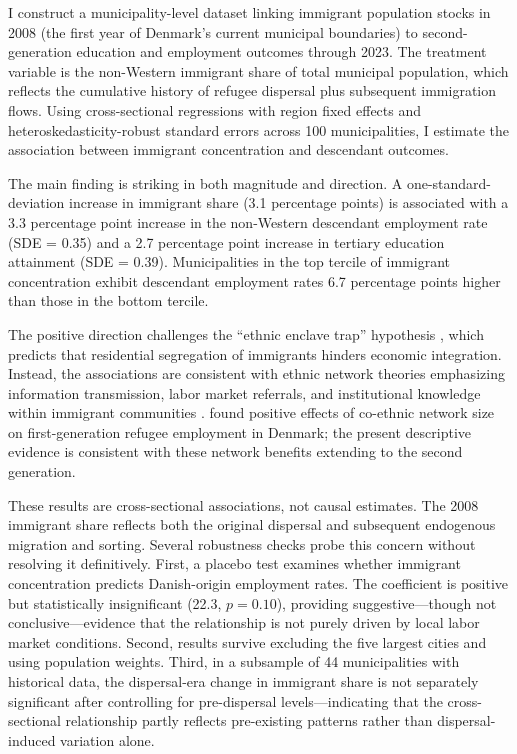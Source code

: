 \documentclass[12pt]{article}
\begin{document}
I construct a municipality-level dataset linking immigrant population stocks in 2008 (the first year of Denmark's current municipal boundaries) to second-generation education and employment outcomes through 2023. The treatment variable is the non-Western immigrant share of total municipal population, which reflects the cumulative history of refugee dispersal plus subsequent immigration flows. Using cross-sectional regressions with region fixed effects and heteroskedasticity-robust standard errors across 100 municipalities, I estimate the association between immigrant concentration and descendant outcomes.

The main finding is striking in both magnitude and direction. A one-standard-deviation increase in immigrant share (3.1 percentage points) is associated with a 3.3 percentage point increase in the non-Western descendant employment rate (SDE = 0.35) and a 2.7 percentage point increase in tertiary education attainment (SDE = 0.39). Municipalities in the top tercile of immigrant concentration exhibit descendant employment rates 6.7 percentage points higher than those in the bottom tercile.

The positive direction challenges the ``ethnic enclave trap'' hypothesis \citep{cutler1997, borjas1995}, which predicts that residential segregation of immigrants hinders economic integration. Instead, the associations are consistent with ethnic network theories emphasizing information transmission, labor market referrals, and institutional knowledge within immigrant communities \citep{munshi2003, beaman2012}. \citet{damm2009} found positive effects of co-ethnic network size on first-generation refugee employment in Denmark; the present descriptive evidence is consistent with these network benefits extending to the second generation.

These results are cross-sectional associations, not causal estimates. The 2008 immigrant share reflects both the original dispersal and subsequent endogenous migration and sorting. Several robustness checks probe this concern without resolving it definitively. First, a placebo test examines whether immigrant concentration predicts Danish-origin employment rates. The coefficient is positive but statistically insignificant (22.3, $p = 0.10$), providing suggestive---though not conclusive---evidence that the relationship is not purely driven by local labor market conditions. Second, results survive excluding the five largest cities and using population weights. Third, in a subsample of 44 municipalities with historical data, the dispersal-era change in immigrant share is not separately significant after controlling for pre-dispersal levels---indicating that the cross-sectional relationship partly reflects pre-existing patterns rather than dispersal-induced variation alone.
\end{document}
